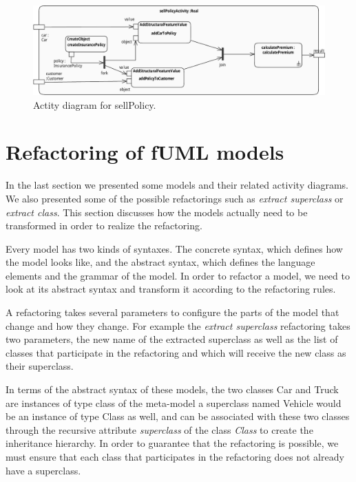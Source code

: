 \documentclass{llncs}
\begin{document}
\begin{figure}[h!t]
 \centering
 \includegraphics[scale=0.6]{images/sellPolicy.pdf}
 \caption{Actity diagram for sellPolicy.}
 \label{fig:sellPolicy}
\end{figure}

\section{Refactoring of fUML models}
\label{sec:fuml-refactoring}

In the last section we presented some models and their related activity diagrams. We also presented some of the possible refactorings such as \textit{extract superclass} or \textit{extract class}. This section discusses how the models actually need to be transformed in order to realize the refactoring.

Every model has two kinds of syntaxes. The concrete syntax, which defines how the model looks like, and the abstract
syntax, which defines the language elements and the grammar of the model. In order to refactor a model, we need to look at
its abstract syntax and transform it according to the refactoring rules.

A refactoring takes several parameters to configure the parts of the model that change and how they change. For example
the \textit{extract superclass} refactoring takes two parameters, the new name of the extracted superclass as well as
the list of classes that participate in the refactoring and which will receive the new class as their superclass.

In terms of the abstract syntax of these models, the two classes Car and Truck are instances of type class of the meta-model a superclass named Vehicle would be an instance of type Class as well, and can be associated with these two classes through the recursive attribute \textit{superclass} of the class \textit{Class} to create the inheritance hierarchy. In order to guarantee that the refactoring is possible, we must ensure that each class that participates in the 
refactoring does not already have a superclass.
\end{document}
